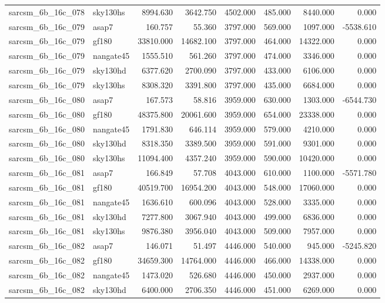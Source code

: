 \begin{tabular}{llrrrrrr}
sarcsm\_6b\_16c\_078 & sky130hs & 8994.630 & 3642.750 & 4502.000 & 485.000 & 8440.000 & 0.000 \\
sarcsm\_6b\_16c\_079 & asap7 & 160.757 & 55.360 & 3797.000 & 569.000 & 1097.000 & -5538.610 \\
sarcsm\_6b\_16c\_079 & gf180 & 33810.000 & 14682.100 & 3797.000 & 464.000 & 14322.000 & 0.000 \\
sarcsm\_6b\_16c\_079 & nangate45 & 1555.510 & 561.260 & 3797.000 & 474.000 & 3346.000 & 0.000 \\
sarcsm\_6b\_16c\_079 & sky130hd & 6377.620 & 2700.090 & 3797.000 & 433.000 & 6106.000 & 0.000 \\
sarcsm\_6b\_16c\_079 & sky130hs & 8308.320 & 3391.800 & 3797.000 & 435.000 & 6684.000 & 0.000 \\
sarcsm\_6b\_16c\_080 & asap7 & 167.573 & 58.816 & 3959.000 & 630.000 & 1303.000 & -6544.730 \\
sarcsm\_6b\_16c\_080 & gf180 & 48375.800 & 20061.600 & 3959.000 & 654.000 & 23338.000 & 0.000 \\
sarcsm\_6b\_16c\_080 & nangate45 & 1791.830 & 646.114 & 3959.000 & 579.000 & 4210.000 & 0.000 \\
sarcsm\_6b\_16c\_080 & sky130hd & 8318.350 & 3389.500 & 3959.000 & 591.000 & 9301.000 & 0.000 \\
sarcsm\_6b\_16c\_080 & sky130hs & 11094.400 & 4357.240 & 3959.000 & 590.000 & 10420.000 & 0.000 \\
sarcsm\_6b\_16c\_081 & asap7 & 166.849 & 57.708 & 4043.000 & 610.000 & 1100.000 & -5571.780 \\
sarcsm\_6b\_16c\_081 & gf180 & 40519.700 & 16954.200 & 4043.000 & 548.000 & 17060.000 & 0.000 \\
sarcsm\_6b\_16c\_081 & nangate45 & 1636.610 & 600.096 & 4043.000 & 528.000 & 3335.000 & 0.000 \\
sarcsm\_6b\_16c\_081 & sky130hd & 7277.800 & 3067.940 & 4043.000 & 499.000 & 6836.000 & 0.000 \\
sarcsm\_6b\_16c\_081 & sky130hs & 9876.380 & 3956.040 & 4043.000 & 509.000 & 7957.000 & 0.000 \\
sarcsm\_6b\_16c\_082 & asap7 & 146.071 & 51.497 & 4446.000 & 540.000 & 945.000 & -5245.820 \\
sarcsm\_6b\_16c\_082 & gf180 & 34659.300 & 14764.000 & 4446.000 & 466.000 & 14338.000 & 0.000 \\
sarcsm\_6b\_16c\_082 & nangate45 & 1473.020 & 526.680 & 4446.000 & 450.000 & 2937.000 & 0.000 \\
sarcsm\_6b\_16c\_082 & sky130hd & 6400.000 & 2706.350 & 4446.000 & 451.000 & 6269.000 & 0.000 \\

\end{tabular}
